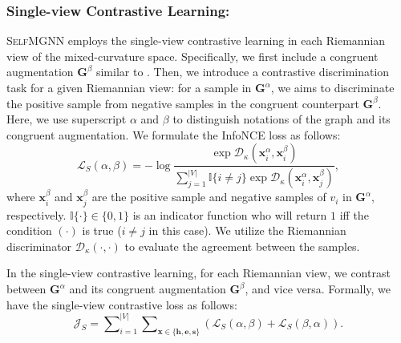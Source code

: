 \subsubsection{Single-view Contrastive Learning:}
\textsc{SelfMGNN} employs the single-view contrastive learning in each Riemannian view of the mixed-curvature space.
Specifically, we first include a congruent augmentation $\mathbf G^\beta$ similar to \citet{ChenK0H20,HassaniA20}.
Then, we introduce a contrastive discrimination task for a given Riemannian view:
for a sample in  $\mathbf G^\alpha$, we aims to discriminate the positive sample from negative samples in the congruent counterpart $\mathbf G^\beta$.
Here, we use superscript $\alpha$ and $\beta$ to distinguish notations of the graph and its congruent augmentation.
We formulate the InfoNCE loss \cite{abs-1807-03748} as follows:
\begin{equation}
\mathcal L_S(\alpha, \beta)=-\log \frac{\exp \mathcal D_\kappa(\mathbf x_i^\alpha, \mathbf x_i^\beta)}{\sum_{j=1}^{|V|}\mathbb I\{i \neq j\}\exp \mathcal D_\kappa(\mathbf x_i^\alpha, \mathbf x_j^\beta)},
\label{alpha_1}
\end{equation}
where $\mathbf x_i^\beta$ and $\mathbf x_j^\beta$ are the positive sample and negative samples of $v_i$ in $\mathbf G^\alpha$, respectively. 
$\mathbb I\{ \cdot \} \in \{0, 1\}$ is an indicator function who will return $1$ iff the condition $(\cdot)$ is true ($i \neq j$ in this case).
We utilize the Riemannian discriminator $\mathcal D_\kappa(\cdot, \cdot)$ to evaluate the agreement between the samples.

In the single-view contrastive learning, 
for each Riemannian view, 
we contrast between $\mathbf G^\alpha$ and its congruent augmentation $\mathbf G^\beta$, and vice versa. 
Formally, we have the single-view contrastive loss as follows:
\begin{equation}
\mathcal J_S = \sum\nolimits_{i=1}^{|V|}\sum\nolimits_{\mathbf x \in \{\mathbf h, \mathbf e, \mathbf s\}}\left(\mathcal L_S(\alpha, \beta)+ \mathcal L_S(\beta, \alpha)\right).
\label{alpha_2}
\end{equation}

